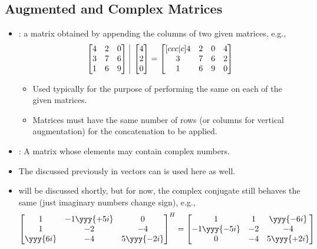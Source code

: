 \begin{itemize}
\begin{itemize}
\begin{itemize}
      \end{itemize}
  \end{itemize}
  
  \subsection{Augmented and Complex Matrices}\label{Augmented and Complex Matrices}
  \begin{itemize}
    \item {}: a matrix obtained by appending the columns of two given matrices, e.g.,
    \[%
    \begin{bmatrix}
    4 & 2 & 0 \\
    3 & 7 & 6 \\
    1 & 6 & 9 
    \end{bmatrix}
    ~\vline~
    \begin{bmatrix} 4 \\ 2 \\ 0 \end{bmatrix}
    =
    \begin{bmatrix}[ccc|c]
      4 & 2 & 0 & 4 \\
      3 & 7 & 6 & 2 \\
      1 & 6 & 9 & 0 
    \end{bmatrix}
    \]%
    \begin{itemize}
      \item Used typically for the purpose of performing the same \hyperref[Elementary Operations]{} on each of the given matrices. 
      \item Matrices must have the same number of rows (or columns for vertical augmentation) for the concatenation to be applied.
    \end{itemize}
    \item {}: A matrix whose elements may contain complex numbers.
    \item The \hyperref[Conjugate Transpose]{} discussed previously in vectors can is used here as well.
    \item \hyperref[Transposition]{} will be discussed shortly, but for now, the complex conjugate still behaves the same (just imaginary numbers change sign), e.g.,
    \[%
    \begin{bmatrix}
    1 & -1\yyy{+5i} & 0 \\
    1 & -2 & -4 \\
   \yyy{ 6i} & -4 & 5\yyy{-2i}  
    \end{bmatrix}^H
    =
    \begin{bmatrix}
    1 & 1 & \yyy{-6i} \\
    -1\yyy{-5i} & -2 & -4 \\
    0 & -4 & 5\yyy{+2i} 
    \end{bmatrix}
    \]%
  \end{itemize}  
\end{itemize}

